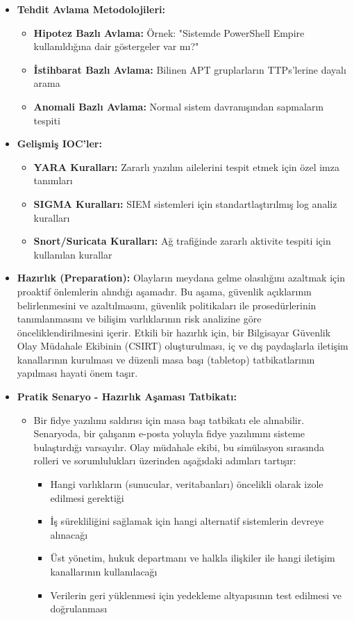 \begin{itemize}
    \item \textbf{Tehdit Avlama Metodolojileri:}
    \begin{itemize}
        \item \textbf{Hipotez Bazlı Avlama:} Örnek: "Sistemde PowerShell Empire kullanıldığına dair göstergeler var mı?"
        \item \textbf{İstihbarat Bazlı Avlama:} Bilinen APT gruplarların TTPs'lerine dayalı arama
        \item \textbf{Anomali Bazlı Avlama:} Normal sistem davranışından sapmaların tespiti
    \end{itemize}

    \item \textbf{Gelişmiş IOC'ler:}
    \begin{itemize}
        \item \textbf{YARA Kuralları:} Zararlı yazılım ailelerini tespit etmek için özel imza tanımları
        \item \textbf{SIGMA Kuralları:} SIEM sistemleri için standartlaştırılmış log analiz kuralları
        \item \textbf{Snort/Suricata Kuralları:} Ağ trafiğinde zararlı aktivite tespiti için kullanılan kurallar
    \end{itemize}

    \item \textbf{Hazırlık (Preparation):} Olayların meydana gelme olasılığını azaltmak için proaktif önlemlerin alındığı aşamadır. Bu aşama, güvenlik açıklarının belirlenmesini ve azaltılmasını, güvenlik politikaları ile prosedürlerinin tanımlanmasını ve bilişim varlıklarının risk analizine göre önceliklendirilmesini içerir. Etkili bir hazırlık için, bir Bilgisayar Güvenlik Olay Müdahale Ekibinin (CSIRT) oluşturulması, iç ve dış paydaşlarla iletişim kanallarının kurulması ve düzenli masa başı (tabletop) tatbikatlarının yapılması hayati önem taşır.

    \item \textbf{Pratik Senaryo - Hazırlık Aşaması Tatbikatı:}
    \begin{itemize}
        \item Bir fidye yazılımı saldırısı için masa başı tatbikatı ele alınabilir. Senaryoda, bir çalışanın e-posta yoluyla fidye yazılımını sisteme bulaştırdığı varsayılır. Olay müdahale ekibi, bu simülasyon sırasında rolleri ve sorumlulukları üzerinden aşağıdaki adımları tartışır:
        \begin{itemize}
            \item Hangi varlıkların (sunucular, veritabanları) öncelikli olarak izole edilmesi gerektiği
            \item İş sürekliliğini sağlamak için hangi alternatif sistemlerin devreye alınacağı
            \item Üst yönetim, hukuk departmanı ve halkla ilişkiler ile hangi iletişim kanallarının kullanılacağı
            \item Verilerin geri yüklenmesi için yedekleme altyapısının test edilmesi ve doğrulanması
        \end{itemize}
    \end{itemize}


\end{itemize}
